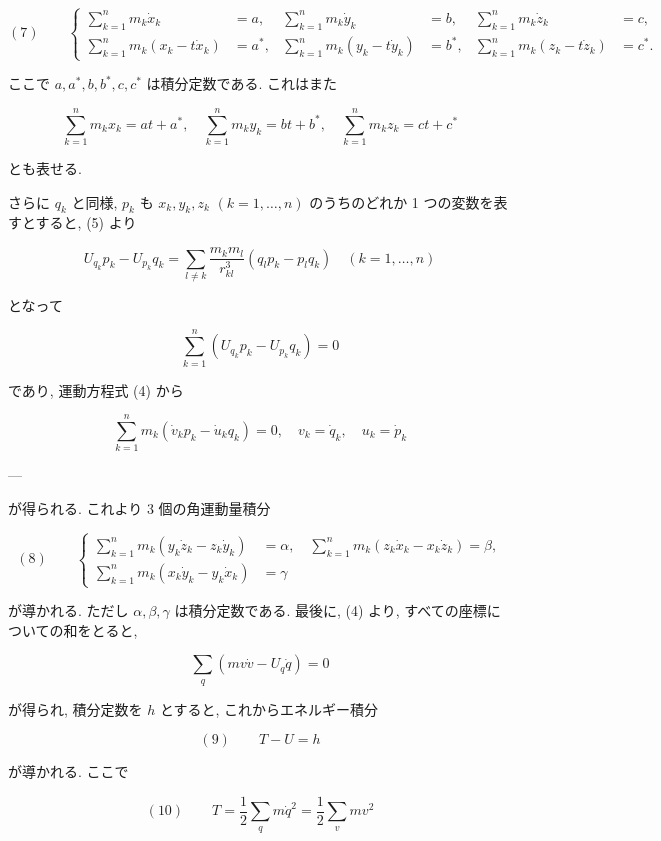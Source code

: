 \documentclass[dvipdfmx, leqno]{jsbook}
\begin{document}
$$(7) \qquad \left\{ \begin{aligned} \sum_{k=1}^{n} m_k \dot{x}_k &= a, & \sum_{k=1}^{n} m_k \dot{y}_k &= b, & \sum_{k=1}^{n} m_k \dot{z}_k &= c, \\ \sum_{k=1}^{n} m_k (x_k - t\dot{x}_k) &= a^*, & \sum_{k=1}^{n} m_k (y_k - t\dot{y}_k) &= b^*, & \sum_{k=1}^{n} m_k (z_k - t\dot{z}_k) &= c^*. \end{aligned} \right.$$

ここで $a, a^*, b, b^*, c, c^*$ は積分定数である. これはまた

$$\sum_{k=1}^{n} m_k x_k = at + a^*, \quad \sum_{k=1}^{n} m_k y_k = bt + b^*, \quad \sum_{k=1}^{n} m_k z_k = ct + c^*$$

とも表せる.

さらに $q_k$ と同様, $p_k$ も $x_k, y_k, z_k$ $(k=1,\dots,n)$ のうちのどれか 1 つの変数を表すとすると, (5) より

$$U_{q_k} p_k - U_{p_k} q_k = \sum_{l \neq k} \frac{m_k m_l}{r_{kl}^3} (q_l p_k - p_l q_k) \quad (k=1,\dots,n)$$

となって

$$\sum_{k=1}^{n} (U_{q_k} p_k - U_{p_k} q_k) = 0$$

であり, 運動方程式 (4) から

$$\sum_{k=1}^{n} m_k (\dot{v}_k p_k - \dot{u}_k q_k) = 0, \quad v_k = \dot{q}_k, \quad u_k = \dot{p}_k$$

---


が得られる. これより 3 個の角運動量積分

$$(8) \qquad \left\{ \begin{aligned} \sum_{k=1}^{n} m_k (y_k \dot{z}_k - z_k \dot{y}_k) &= \alpha, \quad \sum_{k=1}^{n} m_k (z_k \dot{x}_k - x_k \dot{z}_k) = \beta, \\ \sum_{k=1}^{n} m_k (x_k \dot{y}_k - y_k \dot{x}_k) &= \gamma \end{aligned} \right.$$

が導かれる. ただし $\alpha, \beta, \gamma$ は積分定数である. 最後に, (4) より, すべての座標についての和をとると,

$$\sum_{q} (mv\dot{v} - U_q \dot{q}) = 0$$

が得られ, 積分定数を $h$ とすると, これからエネルギー積分

$$(9) \qquad T - U = h$$

が導かれる. ここで

$$(10) \qquad T = \frac{1}{2} \sum_{q} m\dot{q}^2 = \frac{1}{2} \sum_{v} mv^2$$
\end{document}
